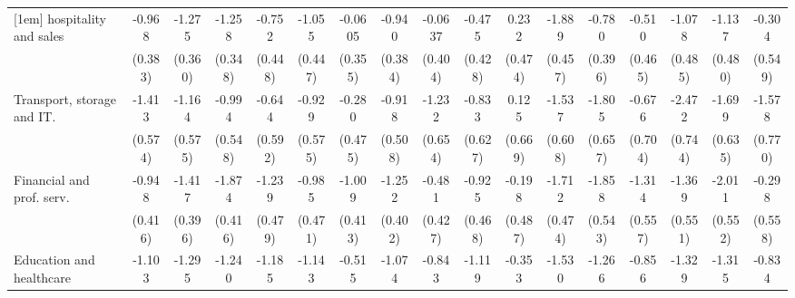 {\begin{tabular}{l*{16}{c}}
[1em]
hospitality and sales&      -0.968\sym{*}  &      -1.275\sym{***}&      -1.258\sym{***}&      -0.752         &      -1.055\sym{*}  &     -0.0605         &      -0.940\sym{*}  &     -0.0637         &      -0.475         &       0.232         &      -1.889\sym{***}&      -0.780\sym{*}  &      -0.510         &      -1.078\sym{*}  &      -1.137\sym{*}  &      -0.304         \\
                    &     (0.383)         &     (0.360)         &     (0.348)         &     (0.448)         &     (0.447)         &     (0.355)         &     (0.384)         &     (0.404)         &     (0.428)         &     (0.474)         &     (0.457)         &     (0.396)         &     (0.465)         &     (0.485)         &     (0.480)         &     (0.549)         \\
[1em]
Transport, storage and IT.&      -1.413\sym{*}  &      -1.164\sym{*}  &      -0.994         &      -0.644         &      -0.929         &      -0.280         &      -0.918         &      -1.232         &      -0.833         &       0.125         &      -1.537\sym{*}  &      -1.805\sym{**} &      -0.676         &      -2.472\sym{***}&      -1.699\sym{**} &      -1.578\sym{*}  \\
                    &     (0.574)         &     (0.575)         &     (0.548)         &     (0.592)         &     (0.575)         &     (0.475)         &     (0.508)         &     (0.654)         &     (0.627)         &     (0.669)         &     (0.608)         &     (0.657)         &     (0.704)         &     (0.744)         &     (0.635)         &     (0.770)         \\
[1em]
Financial and prof. serv.&      -0.948\sym{*}  &      -1.417\sym{***}&      -1.874\sym{***}&      -1.239\sym{**} &      -0.985\sym{*}  &      -1.009\sym{*}  &      -1.252\sym{**} &      -0.481         &      -0.925\sym{*}  &      -0.198         &      -1.712\sym{***}&      -1.858\sym{***}&      -1.314\sym{*}  &      -1.369\sym{*}  &      -2.011\sym{***}&      -0.298         \\
                    &     (0.416)         &     (0.396)         &     (0.416)         &     (0.479)         &     (0.471)         &     (0.413)         &     (0.402)         &     (0.427)         &     (0.468)         &     (0.487)         &     (0.474)         &     (0.543)         &     (0.557)         &     (0.551)         &     (0.552)         &     (0.558)         \\
[1em]
Education and healthcare&      -1.103\sym{**} &      -1.295\sym{**} &      -1.240\sym{**} &      -1.185\sym{**} &      -1.143\sym{*}  &      -0.515         &      -1.074\sym{**} &      -0.843         &      -1.119\sym{*}  &      -0.353         &      -1.530\sym{***}&      -1.266\sym{**} &      -0.856         &      -1.329\sym{*}  &      -1.315\sym{**} &      -0.834         \\

\end{tabular}}
